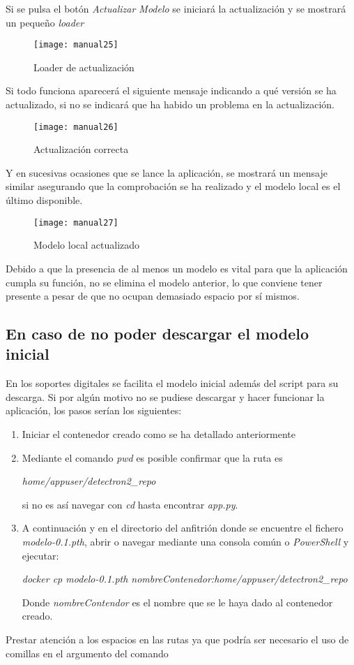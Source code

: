 Si se pulsa el botón \emph{Actualizar Modelo} se iniciará la actualización y se mostrará un pequeño \emph{loader}

    \begin{figure}[htb]
	\centering
	\texttt{[image: manual25]}
	\caption[Loader de actualización]{Loader de actualización}
    \end{figure}

Si todo funciona aparecerá el siguiente mensaje indicando a qué versión se ha actualizado, si no se indicará que ha habido un problema en la actualización.

    \begin{figure}[htb]
	\centering
	\texttt{[image: manual26]}
	\caption[Actualización correcta]{Actualización correcta}
    \end{figure}

\clearpage

Y en sucesivas ocasiones que se lance la aplicación, se mostrará un mensaje similar asegurando que la comprobación se ha realizado y el modelo local es el último disponible.

    \begin{figure}[htb]
	\centering
	\texttt{[image: manual27]}
	\caption[Modelo local actualizado]{Modelo local actualizado}
    \end{figure}

Debido a que la presencia de al menos un modelo es vital para que la aplicación cumpla su función, no se elimina el modelo anterior, lo que conviene tener presente a pesar de que no ocupan demasiado espacio por sí mismos.

\subsection{En caso de no poder descargar el modelo inicial}
En los soportes digitales se facilita el modelo inicial además del script para su descarga. Si por algún motivo no se pudiese descargar y hacer funcionar la aplicación, los pasos serían los siguientes:

\begin{enumerate}
    \item Iniciar el contenedor creado como se ha detallado anteriormente
    \item Mediante el comando \emph{pwd} es posible confirmar que la ruta es \\ \begin{center}
    \emph{home/appuser/detectron2\_repo}\end{center} si no es así navegar con \emph{cd} hasta encontrar \emph{app.py}.
    \item A continuación y en el directorio del anfitrión donde se encuentre el fichero \emph{modelo-0.1.pth}, abrir o navegar mediante una consola común o \emph{PowerShell} y ejecutar:
    \begin{center}\emph{docker cp modelo-0.1.pth nombreContenedor:home/appuser/detectron2\_repo}\end{center}
    Donde \emph{nombreContendor} es el nombre que se le haya dado al contenedor creado.
\end{enumerate}

Prestar atención a los espacios en las rutas ya que podría ser necesario el uso de comillas en el argumento del comando